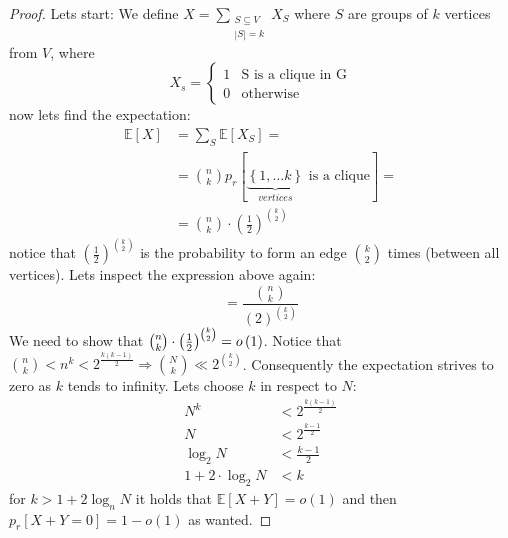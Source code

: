 \begin{proof}
Lets start: We define $X=\sum\limits _{\begin{array}{c}
S\subseteq V\\
\left|S\right|=k
\end{array}}X_{S}$ where $S$ are groups of $k$ vertices from $V$, where
\[
X_{s}=\begin{cases}
1 & \text{S is a clique in G}\\
0 & \text{otherwise}
\end{cases}
\]
 now lets find the expectation:
\begin{align*}
\mathbb{E}\left[X\right] & =\sum\limits _{S}\mathbb{E}\left[X_{S}\right]=\\
 & =\binom{n}{k}p_{r}\left[\underbrace{\left\{ 1,\dots k\right\} }_{vertices}\text{ is a clique}\right]=\\
 & =\binom{n}{k}\cdot\left(\frac{1}{2}\right)^{\binom{k}{2}}
\end{align*}
notice that $\left(\frac{1}{2}\right)^{\binom{k}{2}}$ is the probability
to form an edge $\binom{k}{2}$ times (between all vertices). Lets
inspect the expression above again:
\[
=\frac{\binom{n}{k}}{\left(2\right)^{\binom{k}{2}}}
\]
We need to show that $\binom{n}{k}\cdot\left(\frac{1}{2}\right)^{\binom{k}{2}}=o\left(1\right)$.
Notice that $\binom{n}{k}<n^{k}<2^{\frac{k\left(k-1\right)}{2}}\Rightarrow\binom{N}{k}\ll2^{\binom{k}{2}}$.
Consequently the expectation strives to zero as $k$ tends to infinity.
Lets choose $k$ in respect to $N$: 
\begin{align*}
N^{k} & <2^{\frac{k\left(k-1\right)}{2}}\\
N & <2^{\frac{k-1}{2}}\\
\log_{2}N & <\frac{k-1}{2}\\
1+2\cdot\log_{2}N & <k
\end{align*}
 for $k>1+2\log_{n}N$ it holds that $\mathbb{E}\left[X+Y\right]=o\left(1\right)$
and then $p_{r}\left[X+Y=0\right]=1-o\left(1\right)$ as wanted.
\end{proof}
